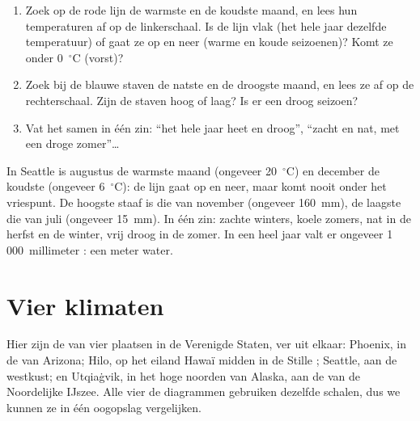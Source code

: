 \begin{method}\label{met:g5:weather-and-climate:reading}
\begin{enumerate}
  \item Zoek op de rode lijn de warmste en de koudste maand, en lees hun
        temperaturen af op de linkerschaal. Is de lijn vlak (het hele jaar
        dezelfde temperatuur) of gaat ze op en neer (warme en koude
        seizoenen)? Komt ze onder 0~$^\circ$C (vorst)?
  \item Zoek bij de blauwe staven de natste en de droogste maand, en lees
        ze af op de rechterschaal. Zijn de staven hoog of laag? Is er een
        droog seizoen?
  \item Vat het samen in één zin: ``het hele jaar heet en droog'', ``zacht
        en nat, met een droge zomer''{\ldots}
\end{enumerate}
\end{method}

\begin{example}[Seattle]\label{ex:g5:weather-and-climate:seattle}
In Seattle is augustus de warmste maand (ongeveer 20~$^\circ$C) en december
de koudste (ongeveer 6~$^\circ$C): de lijn gaat op en neer, maar komt nooit
onder het vriespunt. De hoogste staaf is die van november (ongeveer
160~mm), de laagste die van juli (ongeveer 15~mm). In één zin: zachte
winters, koele zomers, nat in de herfst en de winter, vrij droog in de
zomer. In een heel jaar valt er ongeveer 1\,000~millimeter : een meter
water.
\end{example}

\section{Vier klimaten}

Hier zijn de  van vier plaatsen in de Verenigde Staten,
ver uit elkaar: Phoenix, in de  van Arizona; Hilo, op het eiland
Hawaï midden in de Stille ; Seattle, aan de westkust; en Utqiaġvik,
in het hoge noorden van Alaska, aan de  van de Noordelijke IJszee. Alle
vier de diagrammen gebruiken dezelfde schalen, dus we kunnen ze in één
oogopslag vergelijken.

